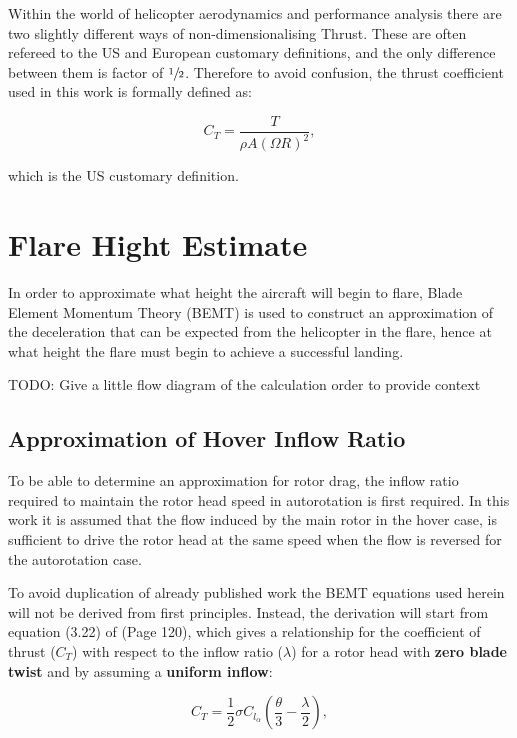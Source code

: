 \documentclass[11pt,a4paper]{article}
\begin{document}
Within the world of helicopter aerodynamics and performance analysis there are two slightly different ways of non-dimensionalising Thrust.  These are often refereed to the US and European customary definitions, and the only difference between them is factor of $\sfrac{1}{2}$.  Therefore to avoid confusion, the thrust coefficient used in this work is formally defined as:

\begin{equation}
	\label{eq:Thrust Coefficient}
	C_{T} = \dfrac{T}{\rho A (\Omega R)^{2}} ,
\end{equation}

which is the US customary definition.


\section{Flare Hight Estimate}

In order to approximate what height the aircraft will begin to flare, Blade Element Momentum Theory (BEMT) is used to construct an approximation of the deceleration that can be expected from the helicopter in the flare, hence at what height the flare must begin to achieve a successful landing.  

TODO: Give a little flow diagram of the calculation order to provide context

\subsection{Approximation of Hover Inflow Ratio}

To be able to determine an approximation for rotor drag, the inflow ratio required to maintain the rotor head speed in autorotation is first required.  In this work it is assumed that the flow induced by the main rotor in the hover case, is sufficient to drive the rotor head at the same speed when the flow is reversed for the autorotation case.

To avoid duplication of already published work the BEMT equations used herein will not be derived from first principles.  Instead, the derivation will start from equation (3.22) of \cite{Leishman} (Page 120), which gives a relationship for the coefficient of thrust ($C_{T}$) with respect to the inflow ratio ($\lambda$) for a rotor head with \textbf{zero blade twist} and by assuming a \textbf{uniform inflow}:

\begin{equation}
	\label{eq:CTStart}
	C_{T} = \dfrac{1}{2} \sigma C_{l_{\alpha}} \left( \dfrac{\theta}{3} - \dfrac{\lambda}{2} \right),
\end{equation}
\end{document}
